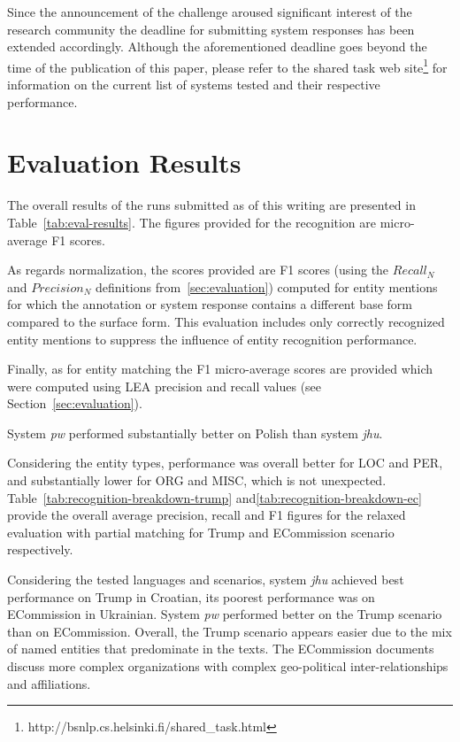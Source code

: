\documentclass[11pt]{article}
\begin{document}
Since the announcement of the challenge aroused significant interest of 
the research community the deadline for submitting system responses
has been extended accordingly. Although the aforementioned deadline
goes beyond the time of the publication of this paper, please refer
to the shared task web site\footnote{http://bsnlp.cs.helsinki.fi/shared\_task.html}
for information on the current list of systems tested and their respective
performance. 

\section{Evaluation Results}
\label{sec:results}

The overall results of the runs submitted as of this writing are presented in
Table~\ref{tab:eval-results}. The figures provided for the recognition are
micro-average F1 scores. 

As regards normalization, the scores provided are F1 scores (using the $Recall_{N}$ and $Precision_{N}$ definitions 
from~\ref{sec:evaluation}) computed for entity mentions for which the annotation or 
system response contains a different base form compared to the surface form. 
This evaluation includes only correctly recognized entity mentions to suppress 
the influence of entity recognition performance.

Finally, as for entity matching the F1 micro-average scores are provided which were computed using 
LEA precision and recall values (see Section~\ref{sec:evaluation}).

System {\em pw} performed substantially better on Polish than system {\em
  jhu}.

Considering the entity types, performance was overall better for LOC and
PER, and substantially lower for ORG and MISC, which is not unexpected. 
Table~\ref{tab:recognition-breakdown-trump} and\ref{tab:recognition-breakdown-ec}
provide the overall average precision, recall and F1 figures for the relaxed evaluation
with partial matching for {\sc Trump} and {\sc ECommission} scenario respectively.

Considering the tested languages and scenarios, system {\em jhu} achieved
best performance on {\sc Trump} in Croatian, its poorest performance was on {\sc ECommission}
in Ukrainian.  System {\em pw} performed better on the {\sc Trump}
scenario than on {\sc ECommission}.  Overall, the {\sc Trump} scenario appears easier
due to the mix of named entities that predominate in the texts.  The {\sc ECommission} documents 
discuss more complex organizations with complex geo-political inter-relationships and affiliations.
\end{document}
